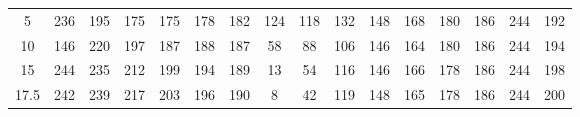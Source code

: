 \begin{table}[]
\begin{tabular}{@{}cccccccccccccccc@{}}
	\multirow{2}{*}{5}    & \multirow{2}{*}{236} & \multirow{2}{*}{195} & \multirow{2}{*}{175} & \multirow{2}{*}{175} & \multirow{2}{*}{178} & \multirow{2}{*}{182} & \multirow{2}{*}{124} & \multirow{2}{*}{118} & \multirow{2}{*}{132} & \multirow{2}{*}{148} & \multirow{2}{*}{168} & \multirow{2}{*}{180} & \multirow{2}{*}{186} & \multirow{2}{*}{244}    & \multirow{2}{*}{192}   \\
						  &                      &                      &                      &                      &                      &                      &                      &                      &                      &                      &                      &                      &                      &                         &                        \\
	\multirow{2}{*}{10}   & \multirow{2}{*}{146} & \multirow{2}{*}{220} & \multirow{2}{*}{197} & \multirow{2}{*}{187} & \multirow{2}{*}{188} & \multirow{2}{*}{187} & \multirow{2}{*}{58}  & \multirow{2}{*}{88}  & \multirow{2}{*}{106} & \multirow{2}{*}{146} & \multirow{2}{*}{164} & \multirow{2}{*}{180} & \multirow{2}{*}{186} & \multirow{2}{*}{244}    & \multirow{2}{*}{194}   \\
						  &                      &                      &                      &                      &                      &                      &                      &                      &                      &                      &                      &                      &                      &                         &                        \\
	\multirow{2}{*}{15}   & \multirow{2}{*}{244} & \multirow{2}{*}{235} & \multirow{2}{*}{212} & \multirow{2}{*}{199} & \multirow{2}{*}{194} & \multirow{2}{*}{189} & \multirow{2}{*}{13}  & \multirow{2}{*}{54}  & \multirow{2}{*}{116} & \multirow{2}{*}{146} & \multirow{2}{*}{166} & \multirow{2}{*}{178} & \multirow{2}{*}{186} & \multirow{2}{*}{244}    & \multirow{2}{*}{198}   \\
						  &                      &                      &                      &                      &                      &                      &                      &                      &                      &                      &                      &                      &                      &                         &                        \\
	\multirow{2}{*}{17.5} & \multirow{2}{*}{242} & \multirow{2}{*}{239} & \multirow{2}{*}{217} & \multirow{2}{*}{203} & \multirow{2}{*}{196} & \multirow{2}{*}{190} & \multirow{2}{*}{8}   & \multirow{2}{*}{42}  & \multirow{2}{*}{119} & \multirow{2}{*}{148} & \multirow{2}{*}{165} & \multirow{2}{*}{178} & \multirow{2}{*}{186} & \multirow{2}{*}{244}    & \multirow{2}{*}{200}   \\

\end{tabular}
\end{table}
